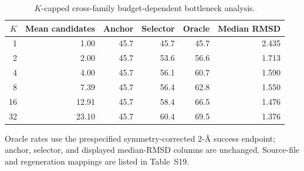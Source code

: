 \begin{table}[!ht]
\centering
\caption{$K$-capped cross-family budget-dependent bottleneck analysis.}
\label{tab:s_kcapped}
\small
\begin{tabular}{rrrrrr}
\toprule
$K$ & Mean candidates & Anchor & Selector & Oracle & Median RMSD \\
\midrule
1 & 1.00 & 45.7 & 45.7 & 45.7 & 2.435 \\
2 & 2.00 & 45.7 & 53.6 & 56.6 & 1.713 \\
4 & 4.00 & 45.7 & 56.1 & 60.7 & 1.590 \\
8 & 7.39 & 45.7 & 56.4 & 62.8 & 1.550 \\
16 & 12.91 & 45.7 & 58.4 & 66.5 & 1.476 \\
32 & 23.10 & 45.7 & 60.4 & 69.5 & 1.376 \\
\bottomrule
\end{tabular}

\vspace{2pt}
\raggedright\footnotesize
Oracle rates use the prespecified symmetry-corrected 2-\AA{} success endpoint; anchor, selector, and displayed median-RMSD columns are unchanged. Source-file and regeneration mappings are listed in Table~S19.
\end{table}
